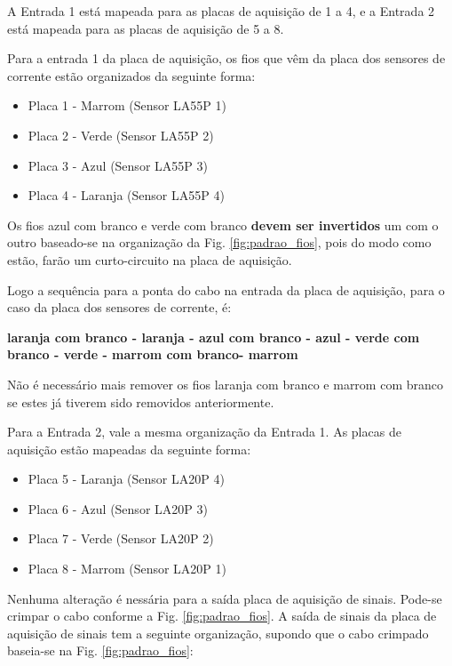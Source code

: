 \begin{apendicesenv}
A Entrada 1 está mapeada para as placas de aquisição de 1 a 4, e a Entrada 2 está mapeada para as placas de aquisição de 5 a 8.

Para a entrada 1 da placa de aquisição, os fios que vêm da placa dos sensores de corrente estão organizados da seguinte forma:

\begin{itemize}
    \item Placa 1 - Marrom (Sensor LA55P 1)
    \item Placa 2 - Verde (Sensor LA55P 2)
    \item Placa 3 - Azul (Sensor LA55P 3)
    \item Placa 4 - Laranja (Sensor LA55P 4)
\end{itemize}

Os fios azul com branco e verde com branco \textbf{devem ser invertidos} um com o outro baseado-se na organização da Fig. \ref{fig:padrao_fios}, pois do modo como estão, farão um curto-circuito na placa de aquisição.

Logo a sequência para a ponta do cabo na entrada da placa de aquisição, para o caso da placa dos sensores de corrente, é:

\textbf{laranja com branco - laranja - azul com branco - azul - verde com branco - verde - marrom com branco- marrom}

Não é necessário mais remover os fios laranja com branco e marrom com branco se estes já tiverem sido removidos anteriormente.

Para a Entrada 2, vale a mesma organização da Entrada 1. As placas de aquisição estão mapeadas da seguinte forma:

\begin{itemize}
    \item Placa 5 - Laranja (Sensor LA20P 4) 
    \item Placa 6 - Azul  (Sensor LA20P 3)
    \item Placa 7 - Verde (Sensor LA20P 2)
    \item Placa 8 - Marrom (Sensor LA20P 1)
\end{itemize}

Nenhuma alteração é nessária para a saída placa de aquisição de sinais. Pode-se crimpar o cabo conforme a Fig. \ref{fig:padrao_fios}. A saída de sinais da placa de aquisição de sinais tem a seguinte organização, supondo que o cabo crimpado baseia-se na Fig. \ref{fig:padrao_fios}:


\end{apendicesenv}
